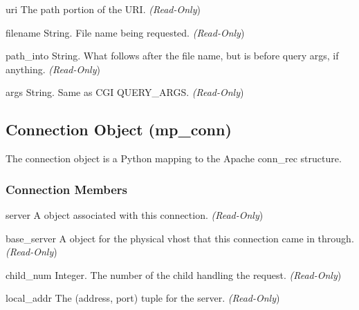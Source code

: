 \begin{memberdesc}[Request]{uri}
The path portion of the URI.
\emph{(Read-Only})
\end{memberdesc}

\begin{memberdesc}[Request]{filename}
String. File name being requested.
\emph{(Read-Only})
\end{memberdesc}

\begin{memberdesc}[Request]{path_into}
String. What follows after the file name, but is before query args, if
anything.
\emph{(Read-Only})
\end{memberdesc}

\begin{memberdesc}[Request]{args}
String. Same as CGI QUERY_ARGS.
\emph{(Read-Only})
\end{memberdesc}

\subsection{Connection Object (mp_conn)\label{pyapi-mpconn}}

The connection object is a Python mapping to the Apache conn_rec
structure.

\subsubsection{Connection Members\label{pyapi-mpconn-mem}}

\begin{memberdesc}[connection]{server}
A  object associated with this connection.
\emph{(Read-Only})
\end{memberdesc}

\begin{memberdesc}[connection]{base_server}
A  object for the physical vhost that this connection came in
through.
\emph{(Read-Only})
\end{memberdesc}

\begin{memberdesc}[connection]{child_num}
Integer. The number of the child handling the request.
\emph{(Read-Only})
\end{memberdesc}

\begin{memberdesc}[connection]{local_addr}
The (address, port) tuple for the server.
\emph{(Read-Only})
\end{memberdesc}


